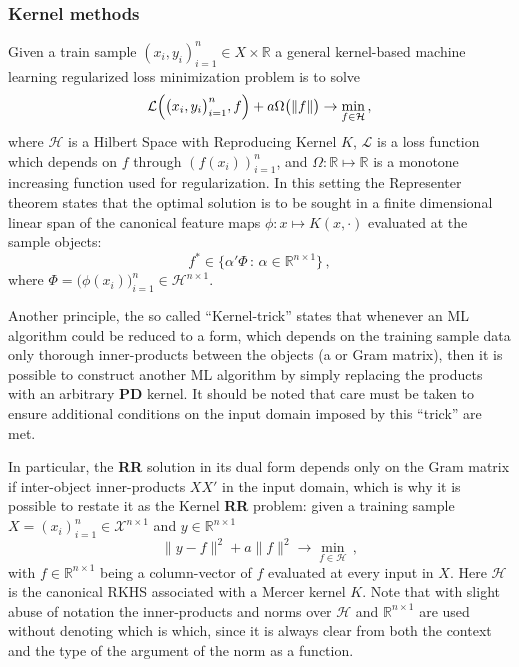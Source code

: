 \documentclass[a4paper,14pt]{article}
\newcommand{\Lcal}{\mathcal{L}}
\newcommand{\Xcal}{\mathcal{X}}
\newcommand{\Hcal}{\mathcal{H}}
\newcommand{\Real}{\mathbb{R}}
\begin{document}

\subsubsection{Kernel methods} %
\label{ssub:kernel_methods}

Given a train sample $(x_i, y_i)_{i=1}^n \in X\times \Real$ a general kernel-based
machine learning regularized loss minimization problem is to solve
$$ \Lcal\Bigl(\bigl(x_i, y_i\bigr)_{i=1}^n, f\Bigr)
  + a \Omega\bigl(\|f\|\bigr)
  \to \min_{f\in \Hcal}\,, $$
where $\Hcal$ is a Hilbert Space with Reproducing Kernel $K$, $\Lcal$ is a loss
function which depends on $f$ through $(f(x_i))_{i=1}^n$, and $\Omega:\Real\mapsto\Real$
is a monotone increasing function used for regularization. In this setting the Representer
theorem states that the optimal solution is to be sought in a finite dimensional
linear span of the canonical feature maps $\phi: x\mapsto K(x, \cdot)$ evaluated at
the sample objects:
$$ f^* \in \bigl\{ \alpha'\Phi\,:\, \alpha \in \Real^{n\times 1} \bigr\} \,, $$
where $\Phi = \bigl(\phi(x_i)\bigr)_{i=1}^n \in \Hcal^{n\times 1}$.

Another principle, the so called ``Kernel-trick'' states that whenever an ML algorithm
could be reduced to a form, which depends on the training sample data only thorough
inner-products between the objects (a or Gram matrix), then it is possible to construct
another ML algorithm by simply replacing the products with an arbitrary \textbf{PD}
kernel. It should be noted that care must be taken to ensure additional conditions
on the input domain imposed by this ``trick'' are met.

In particular, the \textbf{RR} solution in its dual form depends only on the Gram
matrix if inter-object inner-products $X X'$ in the input domain, which is why it is
possible to restate it as the Kernel \textbf{RR} problem: given a training sample
$X = (x_i)_{i=1}^n\in\Xcal^{n\times 1}$ and $y\in\Real^{n\times 1}$
$$ \|y - f\|^2 + a \|f\|^2 \to \min_{f \in \Hcal} \,, $$
with $f \in \Real^{n\times 1}$ being a column-vector of $f$ evaluated at every input
in $X$. Here $\Hcal$ is the canonical RKHS associated with a Mercer kernel $K$. Note
that with slight abuse of notation the inner-products and norms over $\Hcal$ and
$\Real^{n\times 1}$ are used without denoting which is which, since it is always
clear from both the context and the type of the argument of the norm as a function.
\end{document}
